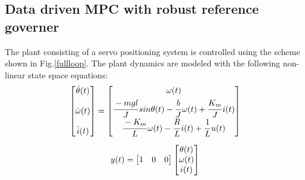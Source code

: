 \documentclass[letterpaper, 10 pt, conference]{ieeeconf}  %
\begin{document}
\begin{enumerate}
	\subsection{Data driven MPC with robust reference governer}
	The plant consisting of a servo positioning system is controlled using the scheme shown in Fig.\ref{fullloop}. The plant dynamics are modeled with the following non-linear state space equations:
	\begin{equation*}
	\begin{matrix}
	\begin{bmatrix}
	\dot{\theta}(t) \vspace{12pt} \\
	\dot{\omega}(t) \vspace{12pt} \\
	\dot{i}(t)
	\end{bmatrix} = 
	\begin{bmatrix}
	\omega(t) \vspace{3pt}\\
	\cfrac{-mgl}{J}\hspace{1pt}sin\theta(t)-\cfrac{b}{J}\hspace{1pt}\omega(t) + \cfrac{K_m}{J}\hspace{1pt}i(t) \\  
	\cfrac{-K_m}{L}\hspace{1pt}\omega(t)-\cfrac{R}{L}\hspace{1pt}i(t) + \cfrac{1}{L}\hspace{1pt}u(t)
	\end{bmatrix} \vspace{10pt}\\
	y(t) = \begin{bmatrix} 1 & 0 & 0 \end{bmatrix} 
	\begin{bmatrix} \theta(t) \\ \omega(t) \\ i(t) \end{bmatrix} 
	\end{matrix}
	\end{equation*}
	

\end{enumerate}
\end{document}
